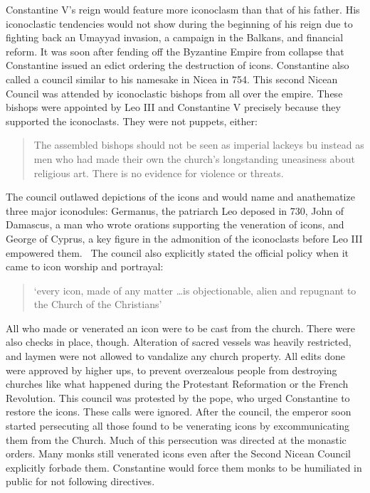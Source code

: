 \documentclass[12pt]{article}
\begin{document}
    Constantine V's reign would feature more iconoclasm than that of his father. His iconoclastic tendencies would not show during the beginning of his reign due to fighting back an Umayyad invasion, a campaign in the Balkans, and financial reform. It was soon after fending off the Byzantine Empire from collapse that Constantine issued an edict ordering the destruction of icons. Constantine also called a council similar to his namesake in Nicea in 754. This second Nicean Council was attended by iconoclastic bishops from all over the empire. These bishops were appointed by Leo III and Constantine V precisely because they supported the iconoclasts. They were not puppets, either: \begin{quote}
        The assembled bishops should not be seen as imperial lackeys bu instead as men who had made their own the church's longstanding uneasiness about religious art. There is no evidence for violence or threats.~\cite[p. 63]{Noble2} 
    \end{quote}\noindent
    The council outlawed depictions of the icons and would name and anathematize three major iconodules: Germanus, the patriarch Leo deposed in 730, John of Damascus, a man who wrote orations supporting the veneration of icons, and George of Cyprus, a key figure in the admonition of the iconoclasts before Leo III empowered them.~\cite[p. 64]{Noble2}  The council also explicitly stated the official policy when it came to icon worship and portrayal: \begin{quote}
         `every icon, made of any matter \dots is objectionable, alien and repugnant to the Church of the Christians' ~\cite[p. 64]{Noble2}
    \end{quote}\noindent
    All who made or venerated an icon were to be cast from the church. There were also checks in place, though. Alteration of sacred vessels was heavily restricted, and laymen were not allowed to vandalize any church property. All edits done were approved by higher ups, to prevent overzealous people from destroying churches like what happened during the Protestant Reformation or the French Revolution. This council was protested by the pope, who urged Constantine to restore the icons. These calls were ignored. After the council, the emperor soon started persecuting all those found to be venerating icons by excommunicating them from the Church. Much of this persecution was directed at the monastic orders. Many monks still venerated icons even after the Second Nicean Council explicitly forbade them. Constantine would force them monks to be humiliated in public for not following directives. \
\end{document}
